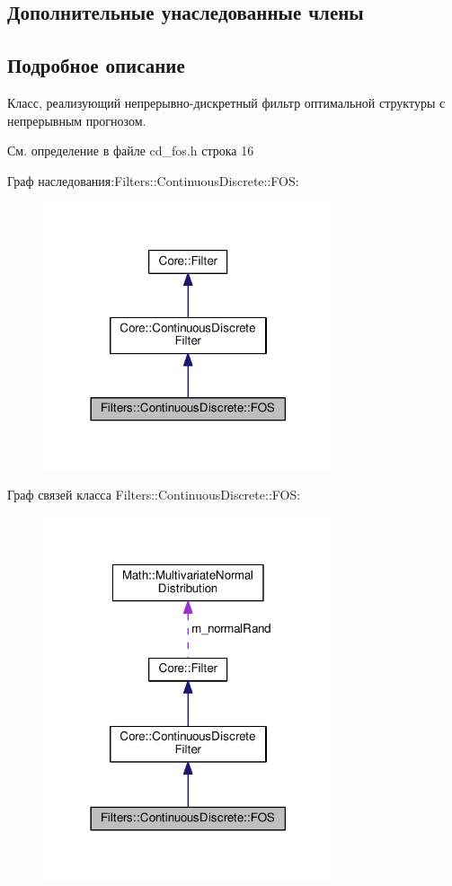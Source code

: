 \subsection*{Дополнительные унаследованные члены}


\subsection{Подробное описание}
Класс, реализующий непрерывно-\/дискретный фильтр оптимальной структуры с непрерывным прогнозом. 

См. определение в файле cd\+\_\+fos.\+h строка 16



Граф наследования\+:Filters\+:\+:Continuous\+Discrete\+:\+:F\+OS\+:
\nopagebreak
\begin{figure}[H]
\begin{center}
\leavevmode
\includegraphics[width=242pt]{class_filters_1_1_continuous_discrete_1_1_f_o_s__inherit__graph}
\end{center}
\end{figure}


Граф связей класса Filters\+:\+:Continuous\+Discrete\+:\+:F\+OS\+:
\nopagebreak
\begin{figure}[H]
\begin{center}
\leavevmode
\includegraphics[width=242pt]{class_filters_1_1_continuous_discrete_1_1_f_o_s__coll__graph}
\end{center}
\end{figure}


